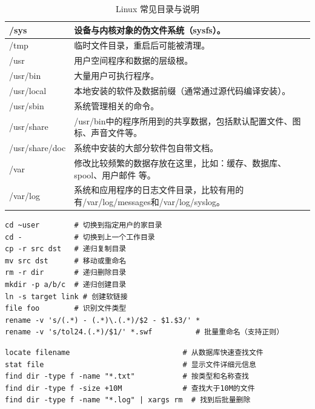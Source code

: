 \begin{table}[H]
\begin{tabular}{|l|p{11cm}|}
		\hline
		/sys           & 设备与内核对象的伪文件系统（sysfs）。                                   \\
		\hline
		/tmp           & 临时文件目录，重启后可能被清理。                                        \\
		\hline
		/usr           & 用户空间程序和数据的层级根。                                          \\
		\hline
		/usr/bin       & 大量用户可执行程序。                                              \\
		\hline
		/usr/local     & 本地安装的软件及数据前缀（通常通过源代码编译安装）。                              \\
		\hline
		/usr/sbin      & 系统管理相关的命令。                                              \\
		\hline
		/usr/share     & /usr/bin中的程序所用到的共享数据，包括默认配置文件、图标、声音文件等。                 \\
		\hline
		/usr/share/doc & 系统中安装的大部分软件包自带文档。                                       \\
		\hline
		/var           & 修改比较频繁的数据存放在这里，比如：缓存、数据库、spool、用户邮件 等。                  \\
		\hline
		/var/log       & 系统和应用程序的日志文件目录，比较有用的有/var/log/messages和/var/log/syslog。 \\
		\hline
	\end{tabular}
	\caption{Linux 常见目录与说明}
\end{table}

\begin{code}[title=目录与文件操作]
	\begin{verbatim}
cd ~user        # 切换到指定用户的家目录
cd -            # 切换到上一个工作目录
cp -r src dst   # 递归复制目录
mv src dst      # 移动或重命名
rm -r dir       # 递归删除目录
mkdir -p a/b/c  # 递归创建目录
ln -s target link # 创建软链接
file foo        # 识别文件类型
rename -v 's/(.*) - (.*)\.(.*)/$2 - $1.$3/' *
rename -v 's/tol24.(.*)/$1/' *.swf          # 批量重命名（支持正则）
	\end{verbatim}
\end{code}

\begin{code}[title=文件查找]
	\begin{verbatim}
locate filename                          # 从数据库快速查找文件
stat file                                # 显示文件详细元信息
find dir -type f -name "*.txt"           # 按类型和名称查找
find dir -type f -size +10M              # 查找大于10M的文件
find dir -type f -name "*.log" | xargs rm  # 找到后批量删除
	\end{verbatim}
\end{code}

